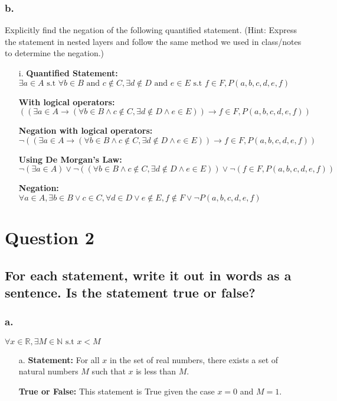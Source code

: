 \documentclass{article}
\begin{document}
\subsubsection*{b.} Explicitly find the negation of the following quantified statement. (Hint: Express the statement
in nested layers and follow the same method we used in class/notes to determine the negation.)
\begin{itemize}
    \item[i.] \textbf{Quantified Statement: } $\exists a \in A \text{ s.t } \forall b \in B \text{ and } c \notin C, \exists d \notin D \text{ and } e \in E \text{ s.t } f \in F, P(a,b,c,d,e,f)$
    \item[] \textbf{With logical operators: } $((\exists a \in A \rightarrow (\forall b \in B \land c \notin C, \exists d \notin D \land e \in E)) \rightarrow f \in F, P(a,b,c,d,e,f))$
    \item[] \textbf{Negation with logical operators: } $\lnot((\exists a \in A \rightarrow (\forall b \in B \land c \notin C, \exists d \notin D \land e \in E)) \rightarrow f \in F, P(a,b,c,d,e,f))$
    \item[] \textbf{Using De Morgan's Law: } $\lnot(\exists a \in A) \lor \lnot((\forall b \in B \land c \notin C, \exists d \notin D \land e \in E)) \lor \lnot(f \in F, P(a,b,c,d,e,f))$
    \item[] \textbf{Negation: } $\forall a \in A, \exists b \in B \lor c \in C, \forall d \in D \lor e \notin E, f \notin F \lor \lnot P(a,b,c,d,e,f)$
\end{itemize}
\section*{Question 2}
\subsection*{\textbf{For each statement, write it out in words as a sentence. Is the statement true or false?}}
\subsubsection*{a.} $\forall x \in \mathbb{R}, \exists M \in \mathbb{N} \text{ s.t } x < M$
\begin{itemize}
    \item[a.] \textbf{Statement: } For all $x$ in the set of real numbers, there exists a set of natural numbers $M$ such that $x$ is less than $M$.
    \item[] \textbf{True or False: } This statement is True given the case $x = 0$ and $M = 1$.
\end{itemize}
\end{document}
